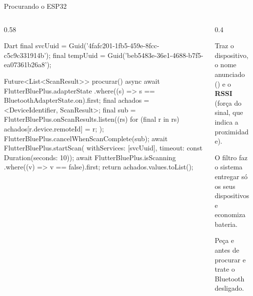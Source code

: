 \documentclass[aspectratio=169,10pt]{beamer}
\begin{document}
\begin{frame}[fragile]{Procurando o ESP32}
  \begin{columns}[T]
    \begin{column}{0.58\textwidth}
\begin{codigo}[title=data/services/ble\_service.dart]{Dart}
final svcUuid = Guid('4fafc201-1fb5-459e-8fcc-c5c9c331914b');
final tempUuid = Guid('beb5483e-36e1-4688-b7f5-ea07361b26a8');

Future<List<ScanResult>> procurar() async {
  await FlutterBluePlus.adapterState
      .where((s) => s == BluetoothAdapterState.on).first;
  final achados = <DeviceIdentifier, ScanResult>{};
  final sub = FlutterBluePlus.onScanResults.listen((rs) {
    for (final r in rs) achados[r.device.remoteId] = r;
  });
  FlutterBluePlus.cancelWhenScanComplete(sub);
  await FlutterBluePlus.startScan(
      withServices: [svcUuid],
      timeout: const Duration(seconds: 10));
  await FlutterBluePlus.isScanning
      .where((v) => v == false).first;
  return achados.values.toList();
}
\end{codigo}
    \end{column}
    \begin{column}{0.4\textwidth}
      \begin{conceito}
        Traz o dispositivo, o nome anunciado () e o \textbf{RSSI} (força do sinal, que indica a proximidade).
      \end{conceito}
      \begin{dica}
        O filtro  faz o sistema entregar só os seus dispositivos e economiza bateria.
      \end{dica}
      \begin{atencao}
        Peça  e  antes de procurar e trate o Bluetooth desligado.
      \end{atencao}
    \end{column}
  \end{columns}
\end{frame}
\end{document}
